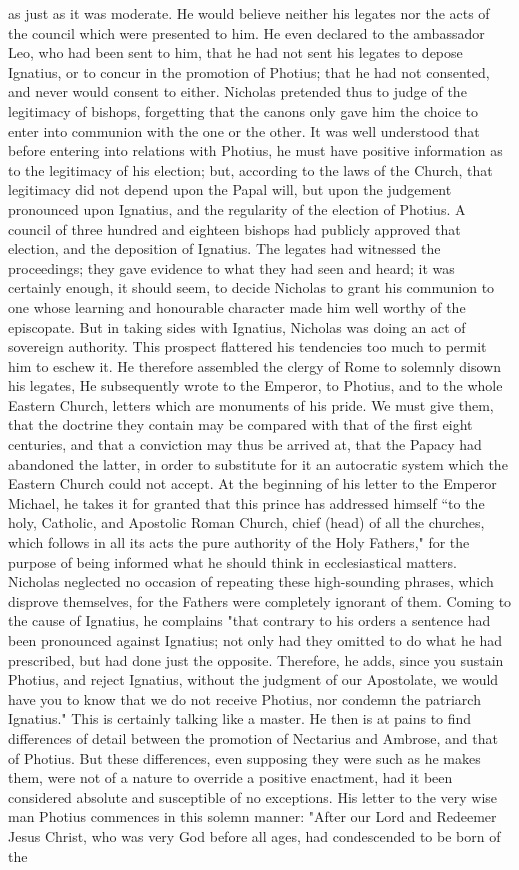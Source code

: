 as just as it was moderate. He would believe neither his legates nor the acts of the council which were presented to him. He even declared to the ambassador Leo, who had been sent to him, that he had not sent his legates to depose Ignatius, or to concur in the promotion of Photius; that he had not consented, and never would consent to either. Nicholas pretended thus to judge of the legitimacy of bishops, forgetting that the canons only gave him the choice to enter into communion with the one or the other. It was well understood that before entering into relations with Photius, he must have positive information as to the legitimacy of his election; but, according to the laws of the Church, that legitimacy did not depend upon the Papal will, but upon the judgement pronounced upon Ignatius, and the regularity of the election of Photius. A council of three hundred and eighteen bishops had publicly approved that election, and the deposition of Ignatius. The legates had witnessed the proceedings; they gave evidence to what they had seen and heard; it was certainly enough, it should seem, to decide Nicholas to grant his communion to one whose learning and honourable character made him well worthy of the episcopate. But in taking sides with Ignatius, Nicholas was doing an act of sovereign authority. This prospect flattered his tendencies too much to permit him to eschew it. He therefore assembled the clergy of Rome to solemnly disown his legates, He subsequently wrote to the Emperor, to Photius, and to the whole Eastern Church, letters which are monuments of his pride. We must give them, that the doctrine they contain may be compared with that of the first eight centuries, and that a conviction may thus be arrived at, that the Papacy had abandoned the latter, in order to substitute for it an autocratic system which the Eastern Church could not accept. At the beginning of his letter to the Emperor Michael, he takes it for granted that this prince has addressed himself “to the holy, Catholic, and Apostolic Roman Church, chief (head) of all the churches, which follows in all its acts the pure authority of the Holy Fathers," for the purpose of being informed what he should think in ecclesiastical matters. Nicholas neglected no occasion of repeating these high-sounding phrases, which disprove themselves, for the Fathers were completely ignorant of them. Coming to the cause of Ignatius, he complains "that contrary to his orders a sentence had been pronounced against Ignatius; not only had they omitted to do what he had prescribed, but had done just the opposite. Therefore, he adds, since you sustain Photius, and reject Ignatius, without the judgment of our Apostolate, we would have you to know that we do not receive Photius, nor condemn the patriarch Ignatius." This is certainly talking like a master. He then is at pains to find differences of detail between the promotion of Nectarius and Ambrose, and that of Photius. But these differences, even supposing they were such as he makes them, were not of a nature to override a positive enactment, had it been considered absolute and susceptible of no exceptions. His letter to the very wise man Photius commences in this solemn manner: "After our Lord and Redeemer Jesus Christ, who was very God before all ages, had condescended to be born of the 